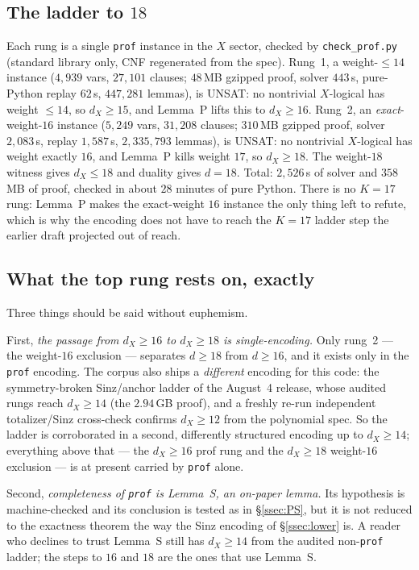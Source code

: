 \documentclass[11pt]{amsart}
\newcommand{\dX}{d_{X}}
\theoremstyle{plain}
\theoremstyle{definition}
\theoremstyle{remark}
\begin{document}
\subsection{The ladder to $18$}\label{ssec:ladder288}
Each rung is a single \texttt{prof} instance in the $X$ sector, checked by
\texttt{check\_prof.py} (standard library only, CNF regenerated from the spec).
Rung~1, a weight-$\le14$ instance ($4{,}939$ vars, $27{,}101$ clauses; $48$\,MB
gzipped proof, solver $443$\,s, pure-Python replay $62$\,s, $447{,}281$ lemmas),
is UNSAT: no nontrivial $X$-logical has weight $\le14$, so $\dX\ge15$, and
Lemma~P lifts this to $\dX\ge16$. Rung~2, an \emph{exact}-weight-$16$ instance
($5{,}249$ vars, $31{,}208$ clauses; $310$\,MB gzipped proof, solver
$2{,}083$\,s, replay $1{,}587$\,s, $2{,}335{,}793$ lemmas), is UNSAT: no
nontrivial $X$-logical has weight exactly $16$, and Lemma~P kills weight $17$, so
$\dX\ge18$. The weight-$18$ witness gives $\dX\le18$ and duality gives $d=18$.
Total: $2{,}526$\,s of solver and $358$\,MB of proof, checked in about $28$
minutes of pure Python. There is no $K=17$ rung: Lemma~P makes the exact-weight
$16$ instance the only thing left to refute, which is why the encoding does not
have to reach the $K=17$ ladder step the earlier draft projected out of reach.

\subsection{What the top rung rests on, exactly}\label{ssec:rest288}
Three things should be said without euphemism.

First, \emph{the passage from $\dX\ge16$ to $\dX\ge18$ is single-encoding.} Only
rung~2 --- the weight-$16$ exclusion --- separates $d\ge18$ from $d\ge16$, and it
exists only in the \texttt{prof} encoding. The corpus also ships a
\emph{different} encoding for this code: the symmetry-broken Sinz/anchor ladder
of the August~4 release, whose audited rungs reach $\dX\ge14$ (the $2.94$\,GB
proof), and a freshly re-run independent totalizer/Sinz cross-check confirms
$\dX\ge12$ from the polynomial spec. So the ladder is corroborated in a second,
differently structured encoding up to $\dX\ge14$; everything above that --- the
$\dX\ge16$ prof rung and the $\dX\ge18$ weight-$16$ exclusion --- is at present
carried by \texttt{prof} alone.

Second, \emph{completeness of \texttt{prof} is Lemma~S, an on-paper lemma.} Its
hypothesis is machine-checked and its conclusion is tested as in
\S\ref{ssec:PS}, but it is not reduced to the exactness theorem the way the Sinz
encoding of \S\ref{ssec:lower} is. A reader who declines to trust Lemma~S still
has $\dX\ge14$ from the audited non-\texttt{prof} ladder; the steps to $16$ and
$18$ are the ones that use Lemma~S.
\end{document}

